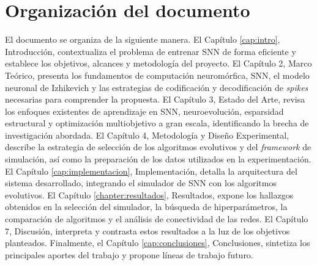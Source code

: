 \section{Organización del documento}

El documento se organiza de la siguiente manera. El Capítulo \ref{cap:intro}, Introducción, contextualiza el problema de entrenar SNN de forma eficiente y establece los objetivos, alcances y metodología del proyecto. El Capítulo 2, Marco Teórico, presenta los fundamentos de computación neuromórfica, SNN, el modelo neuronal de Izhikevich y las estrategias de codificación y decodificación de \textit{spikes} necesarias para comprender la propuesta. El Capítulo 3, Estado del Arte, revisa los enfoques existentes de aprendizaje en SNN, neuroevolución, esparsidad estructural y optimización multiobjetivo a gran escala, identificando la brecha de investigación abordada. El Capítulo 4, Metodología y Diseño Experimental, describe la estrategia de selección de los algoritmos evolutivos y del \textit{framework} de simulación, así como la preparación de los datos utilizados en la experimentación. El Capítulo \ref{cap:implementacion}, Implementación, detalla la arquitectura del sistema desarrollado, integrando el simulador de SNN con los algoritmos evolutivos. El Capítulo \ref{chapter:resultados}, Resultados, expone los hallazgos obtenidos en la selección del simulador, la búsqueda de hiperparámetros, la comparación de algoritmos y el análisis de conectividad de las redes. El Capítulo 7, Discusión, interpreta y contrasta estos resultados a la luz de los objetivos planteados. Finalmente, el Capítulo \ref{cap:conclusiones}, Conclusiones, sintetiza los principales aportes del trabajo y propone líneas de trabajo futuro.
